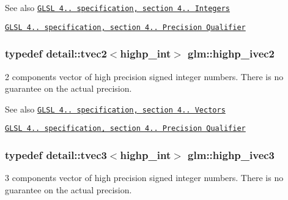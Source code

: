 \begin{DoxySeeAlso}{\-See also}
\href{http://www.opengl.org/registry/doc/GLSLangSpec.4.20.8.pdf}{\tt \-G\-L\-S\-L 4.. specification, section 4.. \-Integers} 

\href{http://www.opengl.org/registry/doc/GLSLangSpec.4.20.8.pdf}{\tt \-G\-L\-S\-L 4.. specification, section 4.. \-Precision \-Qualifier} 
\end{DoxySeeAlso}
\hypertarget{group__core__precision_ga83738eb062e2e6b5e52cd0461da9c742}{
\subsubsection[{highp\-\_\-ivec2}]{\setlength{\rightskip}{0pt plus 5cm}typedef detail\-::tvec2$<$highp\-\_\-int$>$ {\bf glm\-::highp\-\_\-ivec2}}}\label{group__core__precision_ga83738eb062e2e6b5e52cd0461da9c742}
2 components vector of high precision signed integer numbers. \-There is no guarantee on the actual precision.

\begin{DoxySeeAlso}{\-See also}
\href{http://www.opengl.org/registry/doc/GLSLangSpec.4.20.8.pdf}{\tt \-G\-L\-S\-L 4.. specification, section 4.. \-Vectors} 

\href{http://www.opengl.org/registry/doc/GLSLangSpec.4.20.8.pdf}{\tt \-G\-L\-S\-L 4.. specification, section 4.. \-Precision \-Qualifier} 
\end{DoxySeeAlso}
\hypertarget{group__core__precision_ga8d03a7d21f89a6541a278bf78bb6b1fa}{
\subsubsection[{highp\-\_\-ivec3}]{\setlength{\rightskip}{0pt plus 5cm}typedef detail\-::tvec3$<$highp\-\_\-int$>$ {\bf glm\-::highp\-\_\-ivec3}}}\label{group__core__precision_ga8d03a7d21f89a6541a278bf78bb6b1fa}
3 components vector of high precision signed integer numbers. \-There is no guarantee on the actual precision.


